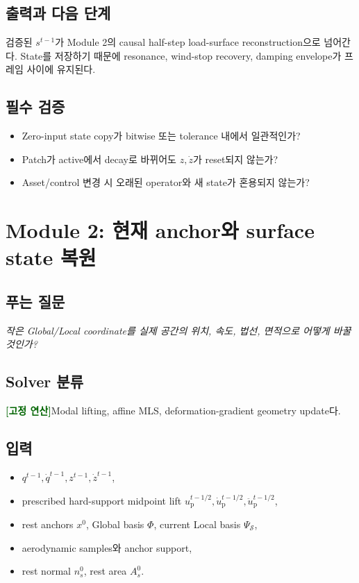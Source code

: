 \documentclass[11pt,a4paper]{article}
\newcommand{\deterministic}{\textcolor{darkgreen}{\textbf{[고정 연산]}}}
\begin{document}
\subsection*{출력과 다음 단계}

검증된 \(s^{t-1}\)가 Module 2의 causal half-step load-surface reconstruction으로 넘어간다.
State를 저장하기 때문에 resonance, wind-stop recovery, damping envelope가 프레임 사이에 유지된다.

\subsection*{필수 검증}

\begin{itemize}[leftmargin=1.5em]
  \item Zero-input state copy가 bitwise 또는 tolerance 내에서 일관적인가?
  \item Patch가 active에서 decay로 바뀌어도 \(z,\dot z\)가 reset되지 않는가?
  \item Asset/control 변경 시 오래된 operator와 새 state가 혼용되지 않는가?
\end{itemize}

\section{Module 2: 현재 anchor와 surface state 복원}

\subsection*{푸는 질문}

\emph{작은 Global/Local coordinate를 실제 공간의 위치, 속도, 법선, 면적으로 어떻게 바꿀 것인가?}

\subsection*{Solver 분류}

\deterministic Modal lifting, affine MLS, deformation-gradient geometry update다.

\subsection*{입력}

\begin{itemize}[leftmargin=1.5em]
  \item \(q^{t-1},\dot q^{t-1},z^{t-1},\dot z^{t-1}\),
  \item prescribed hard-support midpoint lift
  \(u_{\mathrm p}^{t-1/2},\dot u_{\mathrm p}^{t-1/2},
  \ddot u_{\mathrm p}^{t-1/2}\),
  \item rest anchors \(x^0\), Global basis \(\Phi\), current Local basis \(\Psi_{\mathcal S}\),
  \item aerodynamic samples와 anchor support,
  \item rest normal \(n_s^0\), rest area \(A_s^0\).
\end{itemize}
\end{document}
